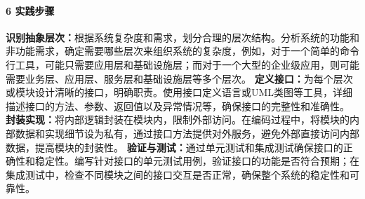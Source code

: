 \paragraph{6 实践步骤}\label{ux5b9eux8df5ux6b65ux9aa4-1}
\textbf{识别抽象层次：}根据系统复杂度和需求，划分合理的层次结构。分析系统的功能和非功能需求，确定需要哪些层次来组织系统的复杂度，例如，对于一个简单的命令行工具，可能只需要应用层和基础设施层；而对于一个大型的企业级应用，则可能需要业务层、应用层、服务层和基础设施层等多个层次。
\textbf{定义接口：}为每个层次或模块设计清晰的接口，明确职责。使用接口定义语言或UML类图等工具，详细描述接口的方法、参数、返回值以及异常情况等，确保接口的完整性和准确性。
\textbf{封装实现：}将内部逻辑封装在模块内，限制外部访问。在编码过程中，将模块的内部数据和实现细节设为私有，通过接口方法提供对外服务，避免外部直接访问内部数据，提高模块的封装性。
\textbf{验证与测试：}通过单元测试和集成测试确保接口的正确性和稳定性。编写针对接口的单元测试用例，验证接口的功能是否符合预期；在集成测试中，检查不同模块之间的接口交互是否正常，确保整个系统的稳定性和可靠性。
